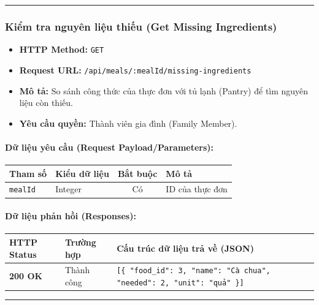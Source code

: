 \documentclass[12pt,a4paper]{article}
\begin{document}
\vskip 0.4cm
\noindent\rule{\textwidth}{0.3pt}
\vskip 0.4cm

\subsubsection{Kiểm tra nguyên liệu thiếu (Get Missing Ingredients)}
\begin{itemize}[leftmargin=*]
    \item \textbf{HTTP Method:} \texttt{GET}
    \item \textbf{Request URL:} \texttt{/api/meals/:mealId/missing-ingredients}
    \item \textbf{Mô tả:} So sánh công thức của thực đơn với tủ lạnh (Pantry) để tìm nguyên liệu còn thiếu.
    \item \textbf{Yêu cầu quyền:} Thành viên gia đình (Family Member).
\end{itemize}

\paragraph{Dữ liệu yêu cầu (Request Payload/Parameters):}
\begin{longtable}{|>{\raggedright\arraybackslash}p{2.8cm}|>{\raggedright\arraybackslash}p{2.2cm}|c|>{\raggedright\arraybackslash}p{7.0cm}|}
\hline
\textbf{Tham số} & \textbf{Kiểu dữ liệu} & \textbf{Bắt buộc} & \textbf{Mô tả} \\ \hline
\endhead
\texttt{mealId} & Integer & Có & ID của thực đơn \\ \hline
\end{longtable}

\paragraph{Dữ liệu phản hồi (Responses):}
\begin{longtable}{|>{\raggedright\arraybackslash}p{2.8cm}|>{\raggedright\arraybackslash}p{3.2cm}|>{\raggedright\arraybackslash}p{8.0cm}|}
\hline
\textbf{HTTP Status} & \textbf{Trường hợp} & \textbf{Cấu trúc dữ liệu trả về (JSON)} \\ \hline
\endhead
\textbf{200 OK} & Thành công & \texttt{[\{ "food\_id": 3, "name": "Cà chua", "needed": 2, "unit": "quả" \}]} \\ \hline
\end{longtable}

\vskip 0.4cm
\noindent\rule{\textwidth}{0.3pt}
\vskip 0.4cm
\end{document}
